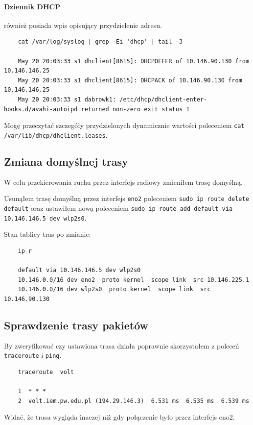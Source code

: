 \documentclass{article} %
\begin{document}
\paragraph{Dziennik DHCP} również posiada wpis opisujący przydzielenie adresu.
\begin{lstlisting}
    cat /var/log/syslog | grep -Ei 'dhcp' | tail -3

    May 20 20:03:33 s1 dhclient[8615]: DHCPOFFER of 10.146.90.130 from 10.146.146.25 
    May 20 20:03:33 s1 dhclient[8615]: DHCPACK of 10.146.90.130 from 10.146.146.25
    May 20 20:03:33 s1 dabrowk1: /etc/dhcp/dhclient-enter-hooks.d/avahi-autoipd returned non-zero exit status 1
\end{lstlisting}

Mogę przeczytać szczegóły przydzielonych dynamicznie wartości poleceniem \texttt{cat /var/lib/dhcp/dhclient.leases}.

\subsection{Zmiana domyślnej trasy}
W celu przekierowania ruchu przez interfejs radiowy zmieniłem trasę domyślną.

Usunąłem trasę domyślną przez interfejs \texttt{eno2} poleceniem \texttt{sudo ip route delete default} oraz ustawiłem nową poleceniem \texttt{sudo ip route add default via 10.146.146.5 dev wlp2s0}.
\vspace{2mm}

Stan tablicy tras po zmianie:
\begin{lstlisting}
    ip r

    default via 10.146.146.5 dev wlp2s0  
    10.146.0.0/16 dev eno2  proto kernel  scope link  src 10.146.225.1
    10.146.0.0/16 dev wlp2s0  proto kernel  scope link  src 10.146.90.130
\end{lstlisting}

\subsection{Sprawdzenie trasy pakietów}
By zweryfikować czy ustawiona trasa działa poprawnie skorzystałem z poleceń \texttt{traceroute} i \texttt{ping}.

\begin{lstlisting}
    traceroute  volt

    1  * * * 
    2  volt.iem.pw.edu.pl (194.29.146.3)  6.531 ms  6.535 ms  6.539 ms
\end{lstlisting}
Widać, że trasa wygląda inaczej niż gdy połączenie było przez interfejs eno2.
\end{document}
